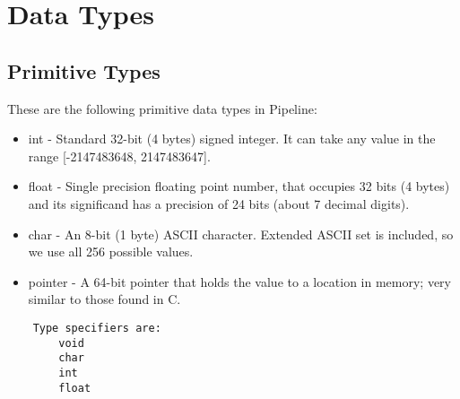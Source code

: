 \documentclass[./LRM_main.tex]{subfiles}
\begin{document}


\chapter{Data Types}



\section{Primitive Types}
These are the following primitive data types in Pipeline:
\begin{itemize}
    \item int -  Standard 32-bit (4 bytes) signed integer. It can take any value in the range [-2147483648, 2147483647].
    \item float - Single precision floating point number, that occupies 32 bits (4 bytes) and its significand has a precision of 24 bits (about 7 decimal digits). 
    \item char - An 8-bit (1 byte) ASCII character. Extended ASCII set is included, so we use all 256 possible values.
    \item pointer - A 64-bit pointer that holds the value to a location in memory; very similar to those found in C.
\end{itemize}
\begin{lstlisting}
	Type specifiers are:
        void
        char
        int
        float

\end{lstlisting}
\end{document}
